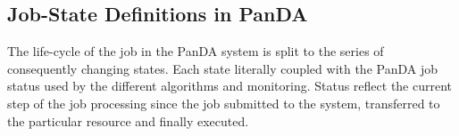 




\subsection{Job-State Definitions in PanDA}
\label{subsec:jobstatedefs}

The life-cycle of the job in the PanDA system is split to the series of
consequently changing states. Each state literally coupled with the PanDA job
status used by the different algorithms and monitoring. Status reflect the
current step of the job processing since the job submitted to the system,
transferred to the particular resource and finally executed.

